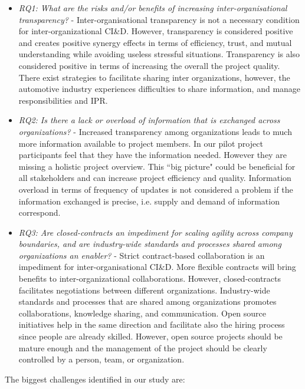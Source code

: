 \begin{itemize}
\item {\em RQ1: What are the risks and/or benefits of increasing inter-organisational transparency?} - Inter-organisational transparency is not a necessary condition for inter-organizational CI\&D. However, transparency is considered positive and creates positive synergy effects in terms of efficiency, trust, and mutual understanding while avoiding useless stressful situations. Transparency is also considered positive in terms of increasing the overall the project quality. 
There exist strategies to facilitate sharing inter organizations, however, the automotive industry experiences difficulties to share information, and manage responsibilities and IPR.
\item {\em RQ2: Is there a lack or overload of information that is exchanged across organizations?} - Increased transparency among organizations leads to much more information available to project members. In our pilot project participants feel that they have the information needed. However they are missing a holistic project overview. This ``big picture" could be beneficial for all stakeholders and can increase project efficiency and quality. Information overload in terms of frequency of updates is not considered a problem if the information exchanged is precise, i.e. supply and demand of information correspond.
\item {\em RQ3: Are closed-contracts an impediment for scaling agility across company boundaries, and 
are industry-wide standards and processes shared among organizations an enabler?} - Strict contract-based collaboration is an impediment for inter-organisational CI\&D. More flexible contracts will bring benefits to inter-organizational collaborations. However, closed-contracts facilitates negotiations between different organizations. Industry-wide standards and processes that are shared among organizations promotes collaborations, knowledge sharing, and communication. Open source initiatives help in the same direction and facilitate also the hiring process since people are already skilled. However, open source projects should be mature enough and the management of the project should be clearly controlled by a person, team, or organization.
\end{itemize}


The biggest challenges identified in our study are: 

